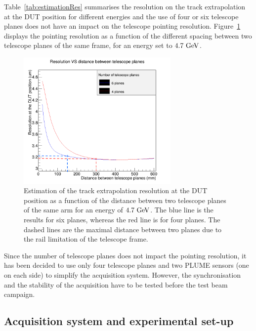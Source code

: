     Table~\ref{tab:estimationRes} summarises the resolution on the track extrapolation at the \gls{DUT} position for different energies and the use of four or six telescope planes does not have an impact on the telescope pointing resolution.
    Figure~\ref{fig:estimationRes4.7GeV} displays the pointing resolution as a function of the different spacing between two telescope planes of the same frame, for an energy set to $4.7~\rm{GeV}$.

    \begin{figure}[!b]
      \centering
      \includegraphics[width = 0.7\textwidth]{Pictures/X0/resolution_4Vs6planes_4-7GeV.png}
      \caption{Estimation of the track extrapolation resolution at the DUT position as a function of the distance between two telescope planes of the same arm for an energy of $4.7~\rm{GeV}$.
      The blue line is the results for six planes, whereas the red line is for four planes. 
      The dashed lines are the maximal distance between two planes due to the rail limitation of the telescope frame.}
      \label{fig:estimationRes4.7GeV}
    \end{figure}

    Since the number of telescope planes does not impact the pointing resolution, it has been decided to use only four telescope planes and two \gls{PLUME} sensors (one on each side) to simplify the acquisition system.
    However, the synchronisation and the stability of the acquisition have to be tested before the test beam campaign. 

    \subsection{Acquisition system and experimental set-up}
      
